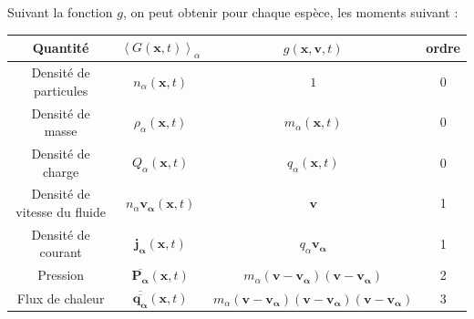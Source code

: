 Suivant la fonction $g$, on peut obtenir pour chaque espèce, les moments suivant : 
\begin{table}[!ht]
\begin{center}
\begin{tabular}{ c|c|c|c } 
Quantité & $\left<G\left(\mathbf{x},t\right)\right>_{\alpha}$ & $g\left(\mathbf{x},\mathbf{v},t\right)$  & ordre\\
\hline
Densité de particules & $n_{\alpha}\left(\mathbf{x},t\right)$ & $1$  & 0 \\
Densité de masse & $\rho_{\alpha}\left(\mathbf{x},t\right)$ & $m_{\alpha}\left(\mathbf{x},t\right)$ & 0 \\
Densité de charge & $Q_{\alpha}\left(\mathbf{x},t\right)$ & $q_{\alpha}\left(\mathbf{x},t\right)$ & 0\\
Densité de vitesse du fluide & $n_{\alpha} \boldsymbol{v_{\alpha}}\left(\mathbf{x},t\right)$ & $\mathbf{v}$ & 1\\
Densité de courant & $\boldsymbol{j_{\alpha}}\left(\mathbf{x},t\right)$ & $q_{\alpha} \boldsymbol{v_{\alpha}}$ & 1\\
Pression & $\overline{\boldsymbol{P_{\alpha}}} \left(\mathbf{x},t\right)$ & $m_{\alpha}\left(\mathbf{v}-\boldsymbol{v_{\alpha}}\right)\left(\mathbf{v}-\boldsymbol{v_{\alpha}}\right)$ & 2\\
Flux de chaleur& $\overline{\overline{\boldsymbol{q_{\alpha}}}}\left(\mathbf{x},t\right)$ & $m_{\alpha}\left(\mathbf{v}-\boldsymbol{v_{\alpha}}\right)\left(\mathbf{v}-\boldsymbol{v_{\alpha}}\right)\left(\mathbf{v}-\boldsymbol{v_{\alpha}}\right)$ & 3\\
\end{tabular}
\end{center}
\end{table}

